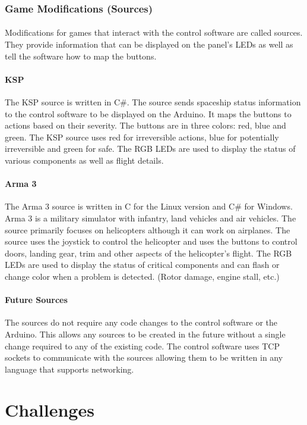 \documentclass[12pt,a4paper]{article}
\begin{document}
\subsubsection{Game Modifications (Sources)}
\paragraph{}
Modifications for games that interact with the control software are called sources. They provide information that can be displayed on the panel's \glspl{LED} as well as tell the software how to map the buttons.
\paragraph{\gls{KSP}}
The \gls{KSP} source is written in C\#. The source sends spaceship status information to the control software to be displayed on the Arduino. It maps the buttons to actions based on their severity. The buttons are in three colors: red, blue and green. The \gls{KSP} source uses red for irreversible actions, blue for potentially irreversible and green for safe. The \gls{RGB} \glspl{LED} are used to display the status of various components as well as flight details.
\paragraph{Arma 3}
The Arma 3 source is written in C for the Linux version and C\# for Windows. Arma 3 is a military simulator with infantry, land vehicles and air vehicles. The source primarily focuses on helicopters although it can work on airplanes. The source uses the joystick to control the helicopter and uses the buttons to control doors, landing gear, trim and other aspects of the helicopter's flight. The \gls{RGB} \glspl{LED} are used to display the status of critical components and can flash or change color when a problem is detected. (Rotor damage, engine stall, etc.)
\paragraph{Future Sources}
The sources do not require any code changes to the control software or the Arduino. This allows any sources to be created in the future without a single change required to any of the existing code. The control software uses \gls{TCP} sockets to communicate with the sources allowing them to be written in any language that supports networking.
\section{Challenges}
\end{document}
